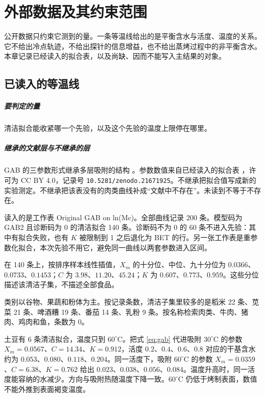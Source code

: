 \chapter{外部数据及其约束范围}
\label{ch:data}

公开数据只约束它测到的量。一条等温线给出的是平衡含水与活度、温度的关系。它不给出冷点轨迹，不给出探针的信息增益，也不给出蒸烤过程中的非平衡含水。本章记录已经读入的拟合表，以及尚缺、因而不能写入主结果的对象。

\section{已读入的等温线}

\paragraph{要判定的量}
清洁拟合能收紧哪一个先验，以及这个先验的温度上限停在哪里。

\paragraph{继承的文献层与不继承的层}
GAB 的三参数形式继承多层吸附的结构 \cite{gab1980}。参数数值来自已经读入的拟合表 \cite{sorption2026}，许可为 CC BY 4.0，记录号 \texttt{10.5281/zenodo.21671925}。不继承把拟合值写成新的实验测定。不继承把该表没有的肉类曲线补成“文献中不存在”。未读到不等于不存在。

读入的是工作表 Original GAB on ln(Mc)。全部曲线记录 200 条。模型码为 GAB2 且诊断码为 0 的清洁拟合 140 条。诊断码不为 0 的 60 条不进入先验：其中有拟合失败，也有 \(K\) 被限制到 1 之后退化为 BET 的行。另一张工作表是重参数化拟合，本次先验不用它，避免同一曲线以两套参数进入区间。

在 140 条上，按排序样本线性插值，\(X_m\) 的十分位、中位、九十分位为 \(0.0366\)、\(0.0733\)、\(0.1453\)；\(C\) 为 \(3.98\)、\(11.20\)、\(45.24\)；\(K\) 为 \(0.607\)、\(0.773\)、\(0.959\)。这些分位描述该清洁子集，不描述全部食品。

类别以谷物、果蔬和粉体为主。按记录条数，清洁子集里较多的是稻米 22 条、苋菜 21 条、啤酒糟 19 条、番茄 14 条、乳粉 9 条。按名称检索肉类、牛肉、猪肉、鸡肉和鱼，条数为 0。

土豆有 6 条清洁拟合，温度只到 \(60^\circ\mathrm{C}\)。把式 \eqref{eq:gab} 代进吸附 \(30^\circ\mathrm{C}\) 的参数 \(X_m=0.0567\)、\(C=14.34\)、\(K=0.912\)，活度 \(0.2\)、\(0.4\)、\(0.6\)、\(0.8\) 对应的干基含水约为 \(0.053\)、\(0.080\)、\(0.118\)、\(0.204\)。同一活度下，吸附 \(60^\circ\mathrm{C}\) 的参数 \(X_m=0.0359\)、\(C=6.38\)、\(K=0.762\) 给出 \(0.023\)、\(0.038\)、\(0.056\)、\(0.084\)。温度升高时，同一活度能容纳的水减少。方向与吸附热随温度下降一致。\(60^\circ\mathrm{C}\) 仍低于烤制表面，数值不能外推到表面褐变温度。

